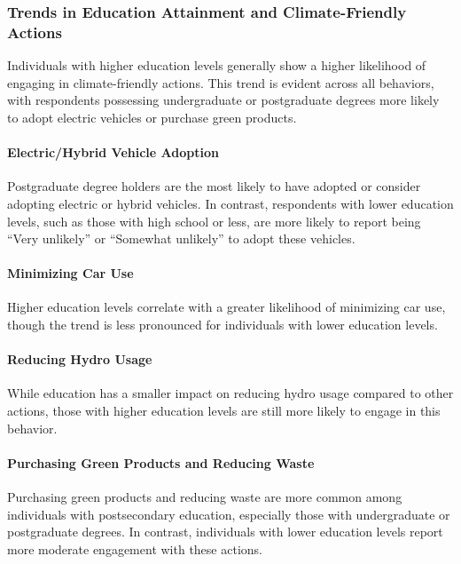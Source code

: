 \documentclass[
  letterpaper,
  DIV=11,
  numbers=noendperiod]{scrartcl}
\let\oldparagraph\paragraph
\renewcommand{\paragraph}[1]{\oldparagraph{#1}\mbox{}}
\begin{document}
\subsubsection{Trends in Education Attainment and Climate-Friendly
Actions}\label{trends-in-education-attainment-and-climate-friendly-actions}

Individuals with higher education levels generally show a higher
likelihood of engaging in climate-friendly actions. This trend is
evident across all behaviors, with respondents possessing undergraduate
or postgraduate degrees more likely to adopt electric vehicles or
purchase green products.

\paragraph{Electric/Hybrid Vehicle
Adoption}\label{electrichybrid-vehicle-adoption}

Postgraduate degree holders are the most likely to have adopted or
consider adopting electric or hybrid vehicles. In contrast, respondents
with lower education levels, such as those with high school or less, are
more likely to report being ``Very unlikely'' or ``Somewhat unlikely''
to adopt these vehicles.

\paragraph{Minimizing Car Use}\label{minimizing-car-use-1}

Higher education levels correlate with a greater likelihood of
minimizing car use, though the trend is less pronounced for individuals
with lower education levels.

\paragraph{Reducing Hydro Usage}\label{reducing-hydro-usage-1}

While education has a smaller impact on reducing hydro usage compared to
other actions, those with higher education levels are still more likely
to engage in this behavior.

\paragraph{Purchasing Green Products and Reducing
Waste}\label{purchasing-green-products-and-reducing-waste}

Purchasing green products and reducing waste are more common among
individuals with postsecondary education, especially those with
undergraduate or postgraduate degrees. In contrast, individuals with
lower education levels report more moderate engagement with these
actions.
\end{document}
